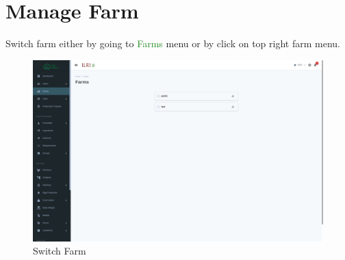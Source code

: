 \section{Manage Farm}\label{sec:farm}
Switch farm either by going to \textcolor{ForestGreen}{Farms} menu or by click on top right farm menu.
\begin{figure}[h!]
  	\includegraphics[width=15cm]{screenshots/farm_page.png}
  	\caption{Switch Farm}
  	\label{fig:farm_page}
\end{figure}